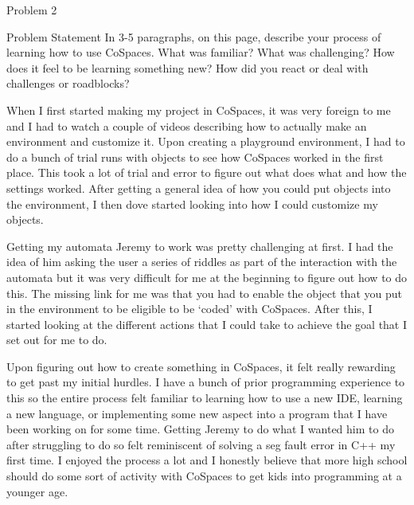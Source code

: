 \begin{problem}{Problem 2}
    \begin{statement}{Problem Statement}
        In 3-5 paragraphs, on this page, describe your process of learning how to use CoSpaces. What was familiar? What was challenging? How does it feel to be learning something new? How did you react 
        or deal with challenges or roadblocks?
    \end{statement}

    \begin{Highlight}[Response]
        When I first started making my project in CoSpaces, it was very foreign to me and I had to watch a couple of videos describing how to actually make an environment and customize it. Upon creating a
        playground environment, I had to do a bunch of trial runs with objects to see how CoSpaces worked in the first place. This took a lot of trial and error to figure out what does what and how the settings
        worked. After getting a general idea of how you could put objects into the environment, I then dove started looking into how I could customize my objects.

        Getting my automata Jeremy to work was pretty challenging at first. I had the idea of him asking the user a series of riddles as part of the interaction with the automata but it was very difficult
        for me at the beginning to figure out how to do this. The missing link for me was that you had to enable the object that you put in the environment to be eligible to be `coded' with CoSpaces. After this,
        I started looking at the different actions that I could take to achieve the goal that I set out for me to do.

        Upon figuring out how to create something in CoSpaces, it felt really rewarding to get past my initial hurdles. I have a bunch of prior programming experience to this so the entire process felt familiar
        to learning how to use a new IDE, learning a new language, or implementing some new aspect into a program that I have been working on for some time. Getting Jeremy to do what I wanted him to do after
        struggling to do so felt reminiscent of solving a seg fault error in C++ my first time. I enjoyed the process a lot and I honestly believe that more high school should do some sort of activity with 
        CoSpaces to get kids into programming at a younger age.


\end{Highlight}
\end{problem}
